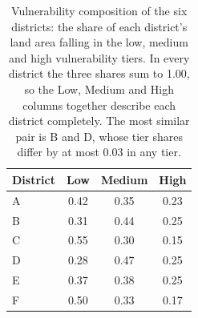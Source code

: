 \begin{table}[htbp]
  \centering
  \caption{Vulnerability composition of the six districts: the share of each district's land area
  falling in the low, medium and high vulnerability tiers. In every district the three
  shares sum to 1.00, so the Low, Medium and High columns together describe each district
  completely. The most similar pair is B and D, whose tier shares differ by at most 0.03
  in any tier.}
  \label{tab:vulnerability-shares}
  \begin{tabular}{l S[table-format=1.2] S[table-format=1.2] S[table-format=1.2]}
    \toprule
    District & {Low} & {Medium} & {High} \\
    \midrule
    A & 0.42 & 0.35 & 0.23 \\
    B & 0.31 & 0.44 & 0.25 \\
    C & 0.55 & 0.30 & 0.15 \\
    D & 0.28 & 0.47 & 0.25 \\
    E & 0.37 & 0.38 & 0.25 \\
    F & 0.50 & 0.33 & 0.17 \\
    \bottomrule
  \end{tabular}
\end{table}
